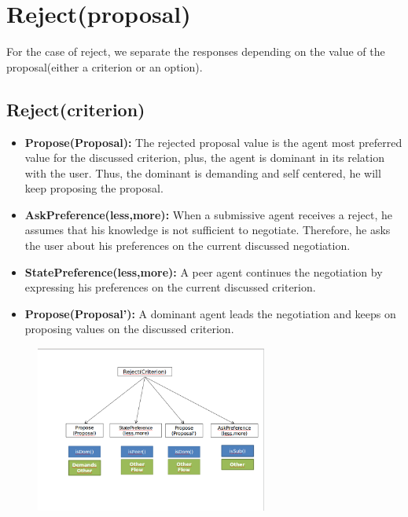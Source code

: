 \documentclass{llncs}
\begin{document}
\section{Reject(proposal)}
	For the case of reject, we separate the responses depending on the value of the proposal(either a criterion or an option).
	\subsection{Reject(criterion)}
	\begin{itemize}
		\item \textbf{Propose(Proposal):} The rejected proposal value is the agent most preferred value for the discussed criterion, plus, the agent is dominant in its relation with the user. Thus, the dominant is demanding and self centered, he will keep proposing the proposal.
		\item \textbf{AskPreference(less,more):} When a submissive agent receives a reject, he assumes that his knowledge is not sufficient to negotiate. Therefore, he asks the user about his preferences on the current discussed negotiation. 
		\item \textbf{StatePreference(less,more):} A peer agent continues the negotiation by expressing his preferences on the current discussed criterion.
		\item\textbf{Propose(Proposal'):} A dominant agent leads the negotiation and keeps on proposing values on the discussed criterion.
		
	\end{itemize}
	\begin{figure}[]
			\centerline{\includegraphics[width=3in]{figs/utterances_v2/RejectCrite.png}}
			\vskip 8pt
	\end{figure}
	
\end{document}
